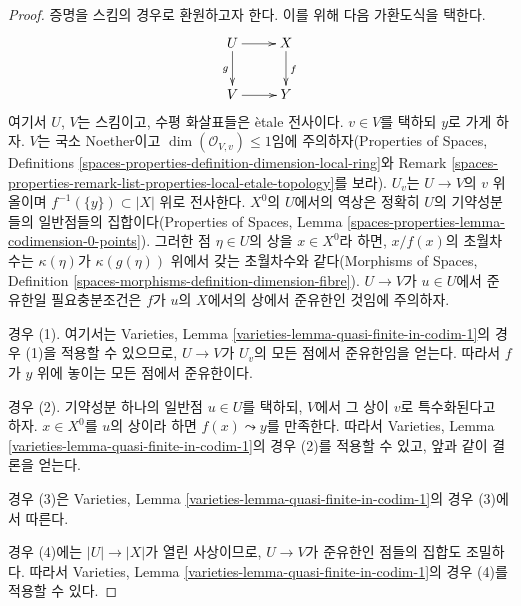 \begin{proof}
증명을 스킴의 경우로 환원하고자 한다. 이를 위해 다음 가환도식을 택한다.
$$
\xymatrix{
U \ar[r] \ar[d]_g & X \ar[d]^f \\
V \ar[r] & Y
}
$$
여기서 $U$, $V$는 스킴이고, 수평 화살표들은 \`etale 전사이다.
$v \in V$를 택하되 $y$로 가게 하자. $V$는 국소 Noether이고
$\dim(\mathcal{O}_{V, v}) \leq 1$임에 주의하자(Properties of Spaces,
Definitions \ref{spaces-properties-definition-dimension-local-ring}와
Remark \ref{spaces-properties-remark-list-properties-local-etale-topology}를
보라). $U_v$는 $U \to V$의 $v$ 위 올이며
$f^{-1}(\{y\}) \subset |X|$ 위로 전사한다. $X^0$의 $U$에서의 역상은
정확히 $U$의 기약성분들의 일반점들의 집합이다(Properties of Spaces,
Lemma \ref{spaces-properties-lemma-codimension-0-points}). 그러한 점
$\eta \in U$의 상을 $x \in X^0$라 하면, $x / f(x)$의 초월차수는
$\kappa(\eta)$가 $\kappa(g(\eta))$ 위에서 갖는 초월차수와 같다(Morphisms
of Spaces, Definition
\ref{spaces-morphisms-definition-dimension-fibre}). $U \to V$가
$u \in U$에서 준유한일 필요충분조건은 $f$가 $u$의 $X$에서의 상에서
준유한인 것임에 주의하자.

\medskip\noindent
경우 (1). 여기서는 Varieties, Lemma
\ref{varieties-lemma-quasi-finite-in-codim-1}의 경우 (1)을 적용할 수
있으므로, $U \to V$가 $U_v$의 모든 점에서 준유한임을 얻는다. 따라서
$f$가 $y$ 위에 놓이는 모든 점에서 준유한이다.

\medskip\noindent
경우 (2). 기약성분 하나의 일반점 $u \in U$를 택하되, $V$에서 그 상이
$v$로 특수화된다고 하자. $x \in X^0$를 $u$의 상이라 하면
$f(x) \leadsto y$를 만족한다. 따라서 Varieties, Lemma
\ref{varieties-lemma-quasi-finite-in-codim-1}의 경우 (2)를 적용할 수
있고, 앞과 같이 결론을 얻는다.

\medskip\noindent
경우 (3)은 Varieties, Lemma
\ref{varieties-lemma-quasi-finite-in-codim-1}의 경우 (3)에서 따른다.

\medskip\noindent
경우 (4)에는 $|U| \to |X|$가 열린 사상이므로, $U \to V$가
준유한인 점들의 집합도 조밀하다. 따라서 Varieties, Lemma
\ref{varieties-lemma-quasi-finite-in-codim-1}의 경우 (4)를 적용할 수 있다.
\end{proof}











